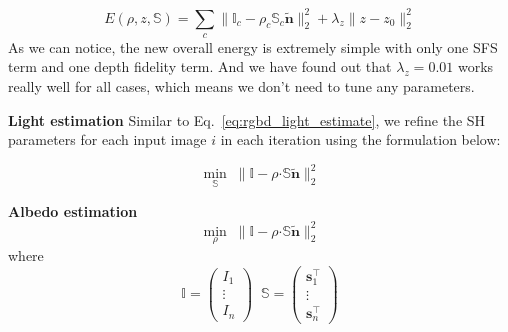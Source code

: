 \begin{equation}\label{eq:robost_energy}
    E(\rho, z, \mathbb{S}) = \sum_{c} \lVert \mathbb{I}_c - \rho_c \mathbb{S}_{c}\tilde{\mathbf{n}}\rVert_2^2 + \lambda_{z}\lVert z - z_0 \rVert_2^2
\end{equation}
As we can notice, the new overall energy is extremely simple with only one SFS term and one depth fidelity term.
And we have found out that $\lambda_z = 0.01$ works really well for all cases, which means we don't need to tune any parameters.

\textbf{Light estimation}
Similar to Eq.~\ref{eq:rgbd_light_estimate}, we refine the SH parameters for each input image $i$ in each iteration using the formulation below:

\begin{equation}\label{eq:robust_light_estimate}
\min_{\mathbb{S}} \; \lVert \mathbb{I} - \rho \boldsymbol{\cdot} \mathbb{S} \tilde{\mathbf{n}} \rVert^2_2
\end{equation}

\textbf{Albedo estimation}
\begin{equation}\label{eq:robust_albedo_estimate}
	\min_{\rho} \; \lVert \mathbb{I} - \rho \boldsymbol{\cdot} \mathbb{S} \tilde{\mathbf{n}} \rVert^2_2 
\end{equation}
where
\begin{equation}
\mathbb{I} = \begin{pmatrix} I_1 \\ \vdots \\ I_n \end{pmatrix}   \; \; \mathbb{S} = \begin{pmatrix} \mathbf{s}_1^\top \\ \vdots \\ \mathbf{s}_n^\top \end{pmatrix}  
\end{equation}



